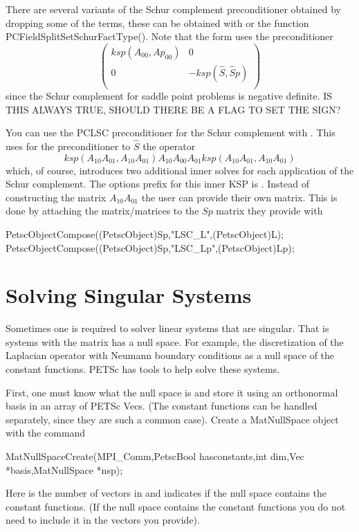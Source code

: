 There are several variants of the Schur complement preconditioner obtained by dropping some of the terms, these can be obtained with  or the function PCFieldSplitSetSchurFactType(). Note that the  form uses the preconditioner
\[
\left( \begin{array}{cc}
ksp(A_{00},Ap_{00})   & 0 \\
0 & -ksp(\hat{S},\hat{S}p) \\
\end{array} \right)
\]
since the Schur complement for saddle point problems is negative definite. IS THIS ALWAYS TRUE, SHOULD THERE BE A FLAG TO SET THE SIGN?

You can use the PCLSC preconditioner for the Schur complement with . This uses for the preconditioner to $\hat{S}$ the operator
\[
 ksp(A_{10} A_{01},A_{10} A_{01}) A_{10} A_{00} A_{01} ksp(A_{10} A_{01},A_{10} A_{01})
\]
 which, of course, introduces two additional inner solves for each application of the Schur complement. The options prefix for this inner KSP is . Instead of constructing the matrix $A_{10} A_{01}$ the user can provide their own matrix. This is done by attaching the matrix/matrices to the $ Sp $ matrix they provide with
\begin{tabbing}
 PetscObjectCompose((PetscObject)Sp,"LSC\_L",(PetscObject)L); \\
 PetscObjectCompose((PetscObject)Sp,"LSC\_Lp",(PetscObject)Lp);
\end{tabbing}

\section{Solving Singular Systems}
\label{sec_singular}

Sometimes one is required to solver linear systems that are singular. 
That is systems with the matrix has a null space. For example, the 
discretization of the Laplacian operator with Neumann boundary conditions
as a null space of the constant functions. PETSc has tools to help
solve these systems.

First, one must know what the null space is and store it using an orthonormal basis
in an array of PETSc Vecs. (The constant functions can be handled separately, since
they are such a common case). Create a MatNullSpace object with the command
\begin{tabbing}
MatNullSpaceCreate(MPI\_Comm,PetscBool  hasconstants,int dim,Vec *basis,MatNullSpace *nsp);
\end{tabbing}
Here  is the number of vectors in  and  indicates
if the null space contains the constant functions. (If the null space contains the constant
functions you do not need to include it in the  vectors you provide).

